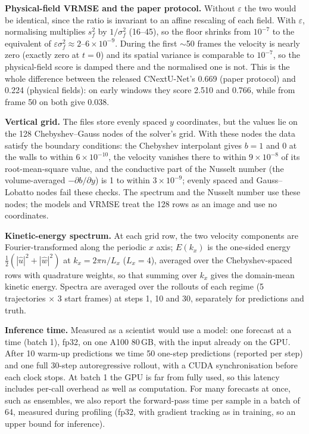 \documentclass[11pt]{article}
\begin{document}
\textbf{Physical-field VRMSE and the paper protocol.} Without $\varepsilon$ the two would be identical, since the ratio is invariant to an
affine rescaling of each field. With $\varepsilon$, normalising multiplies $s_f^2$ by $1/\sigma_f^2$ (16--45), so
the floor shrinks from $10^{-7}$ to the equivalent of $\varepsilon\sigma_f^2\approx 2$--$6\times10^{-9}$. During the
first $\sim$50 frames the velocity is nearly zero (exactly zero at $t=0$) and its spatial variance is comparable to
$10^{-7}$, so the physical-field score is damped there and the normalised one is not. This is the whole difference
between the released CNextU-Net's 0.669 (paper protocol) and 0.224 (physical fields): on early windows they score
2.510 and 0.766, while from frame 50 on both give 0.038.

\textbf{Vertical grid.} The files store evenly spaced $y$ coordinates, but the values lie on the 128
Chebyshev--Gauss nodes of the solver's grid. With these nodes the data satisfy the boundary conditions: the
Chebyshev interpolant gives $b=1$ and $0$ at the walls to within $6\times10^{-10}$, the velocity vanishes there to
within $9\times10^{-8}$ of its root-mean-square value, and the conductive part of the Nusselt number (the
volume-averaged $-\partial b/\partial y$) is 1 to within $3\times10^{-9}$; evenly spaced and Gauss--Lobatto nodes
fail these checks. The spectrum and the Nusselt number use
these nodes; the models and VRMSE treat the 128 rows as an image and use no coordinates.

\textbf{Kinetic-energy spectrum.} At each grid row, the two velocity components are Fourier-transformed along the
periodic $x$ axis; $E(k_x)$ is the one-sided energy $\tfrac12(|\hat u|^2+|\hat w|^2)$ at
$k_x = 2\pi n/L_x$ ($L_x=4$), averaged over the Chebyshev-spaced rows with quadrature weights, so that summing over
$k_x$ gives the domain-mean kinetic energy. Spectra are averaged over the rollouts of each regime (5 trajectories
$\times$ 3 start frames) at steps 1, 10 and 30, separately for predictions and truth.

\textbf{Inference time.} Measured as a scientist would use a model: one forecast at a time (batch 1), fp32, on one
A100 80\,GB, with the input already on the GPU. After 10 warm-up predictions we time 50 one-step predictions
(reported per step) and one full 30-step autoregressive rollout, with a CUDA synchronisation before each clock
stops. At batch 1 the GPU is far from fully used, so this latency includes per-call overhead as well as
computation. For many forecasts at once, such as ensembles, we also report the forward-pass time per sample in a
batch of 64, measured during profiling (fp32, with gradient tracking as in training, so an upper bound for
inference).
\end{document}
